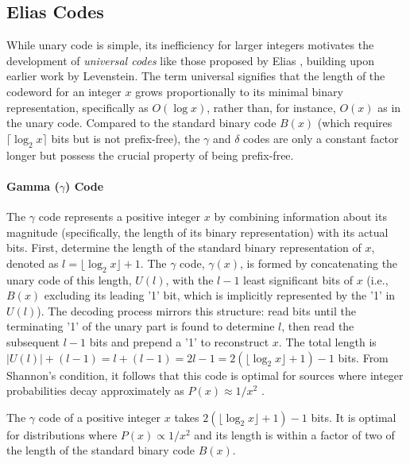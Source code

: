 
\subsection{Elias Codes}
While unary code is simple, its inefficiency for larger integers motivates the development of \emph{universal codes} like those proposed by Elias \cite{Elias1975}, building upon earlier work by Levenstein. The term universal signifies that the length of the codeword for an integer $x$ grows proportionally to its minimal binary representation, specifically as $O(\log x)$, rather than, for instance, $O(x)$ as in the unary code. Compared to the standard binary code $B(x)$ (which requires $\lceil\log_2 x \rceil$ bits but is not prefix-free), the $\gamma$ and $\delta$ codes are only a constant factor longer but possess the crucial property of being prefix-free.

\paragraph{Gamma ($\gamma$) Code} The $\gamma$ code represents a positive integer $x$ by combining information about its magnitude (specifically, the length of its binary representation) with its actual bits. First, determine the length of the standard binary representation of $x$, denoted as $l = \lfloor \log_2 x \rfloor + 1$. The $\gamma$ code, $\gamma(x)$, is formed by concatenating the unary code of this length, $U(l)$, with the $l-1$ least significant bits of $x$ (i.e., $B(x)$ excluding its leading '1' bit, which is implicitly represented by the '1' in $U(l)$).
The decoding process mirrors this structure: read bits until the terminating '1' of the unary part is found to determine $l$, then read the subsequent $l-1$ bits and prepend a '1' to reconstruct $x$. The total length is $|U(l)| + (l-1) = l + (l-1) = 2l-1 = 2(\lfloor \log_2 x \rfloor + 1) - 1$ bits. From Shannon's condition, it follows that this code is optimal for sources where integer probabilities decay approximately as $P(x) \approx 1/x^2$ \cite{ferragina2023pearls}.

\begin{theorem}
    The $\gamma$ code of a positive integer $x$ takes $2(\lfloor \log_2 x \rfloor + 1) - 1$ bits. It is optimal for distributions where $P(x) \propto 1/x^2$ and its length is within a factor of two of the length of the standard binary code $B(x)$.
\end{theorem}

